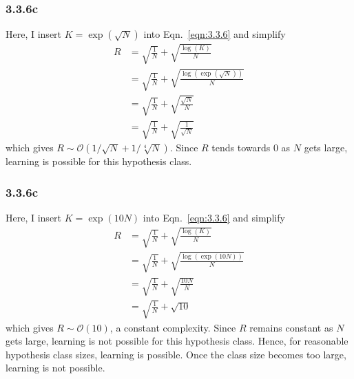 \documentclass[12pt]{amsart}
\begin{document}
\subsubsection*{3.3.6c}

Here, I insert $K = \exp(\sqrt{N})$ into Eqn.~\ref{eqn:3.3.6} and simplify
\begin{equation}
\begin{split}
R & = \sqrt{\frac{1}{N}} + \sqrt{\frac{\log(K)}{N}} \\
& = \sqrt{\frac{1}{N}} + \sqrt{\frac{\log(\exp(\sqrt{N}))}{N}} \\
& = \sqrt{\frac{1}{N}} + \sqrt{\frac{\sqrt{N}}{N}} \\
& = \sqrt{\frac{1}{N}} + \sqrt{\frac{1}{\sqrt{N}}}
\end{split}
\end{equation}
which gives $R {\sim} \mathcal{O}(1/\sqrt{N} + 1/\sqrt[4]{N})$.  Since $R$ tends towards 0 as $N$ gets large, learning is possible for this hypothesis class.

\subsubsection*{3.3.6c}

Here, I insert $K = \exp(10N)$ into Eqn.~\ref{eqn:3.3.6} and simplify
\begin{equation}
\begin{split}
R & = \sqrt{\frac{1}{N}} + \sqrt{\frac{\log(K)}{N}} \\
& = \sqrt{\frac{1}{N}} + \sqrt{\frac{\log(\exp(10N))}{N}} \\
& = \sqrt{\frac{1}{N}} + \sqrt{\frac{10N}{N}} \\ 
& = \sqrt{\frac{1}{N}} + \sqrt{10}
\end{split}
\end{equation}
which gives $R {\sim} \mathcal{O}(10)$, a constant complexity.  Since $R$ remains constant as $N$ gets large, learning is not possible for this hypothesis class.  Hence, for reasonable hypothesis class sizes, learning is possible.  Once the class size becomes too large, learning is not possible.
\end{document}

